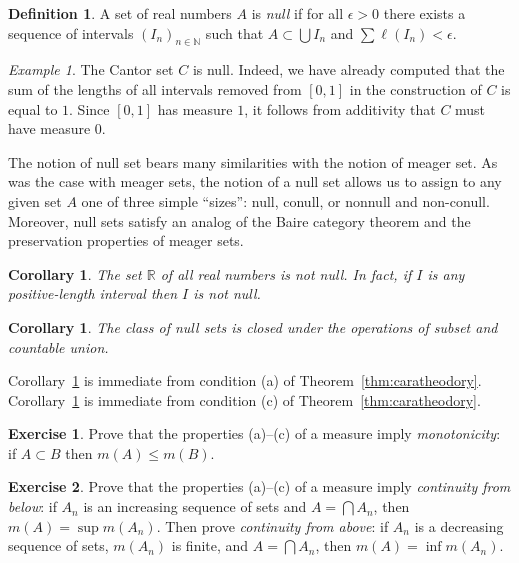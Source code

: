 \documentclass[11pt,oneside,a4paper]{amsbook}
\newcommand{\N}{\mathbb N}
\newcommand{\R}{\mathbb R}
\theoremstyle{definition}
\newtheorem{exercise}{Exercise}[section]
\theoremstyle{plain}
\newtheorem{corollary}[theorem]{Corollary}
\theoremstyle{definition}
\newtheorem{definition}[theorem]{Definition}
\theoremstyle{remark}
\newtheorem{example}[theorem]{Example}
\numberwithin{equation}{section}
\numberwithin{figure}{section}
\begin{document}
\begin{definition}
  \label{defn:null}
  A set of real numbers $A$ is \emph{null} if for all $\epsilon>0$ there exists a sequence of intervals $(I_n)_{n\in\N}$ such that $A\subset\bigcup I_n$ and $\sum\ell(I_n)<\epsilon$.
\end{definition}

\begin{example}
  The Cantor set $C$ is null. Indeed, we have already computed that the sum of the lengths of all intervals removed from $[0,1]$ in the construction of $C$ is equal to $1$. Since $[0,1]$ has measure $1$, it follows from additivity that $C$ must have measure $0$.
\end{example}

The notion of null set bears many similarities with the notion of meager set. As was the case with meager sets, the notion of a null set allows us to assign to any given set $A$ one of three simple ``sizes'': null, conull, or nonnull and non-conull. Moreover, null sets satisfy an analog of the Baire category theorem and the preservation properties of meager sets.

\begin{corollary}
  \label{cor:interval-nonnull}
  The set $\R$ of all real numbers is not null. In fact, if $I$ is any positive-length interval then $I$ is not null.
\end{corollary}

\begin{corollary}
  \label{cor:null-pres}
  The class of null sets is closed under the operations of subset and countable union.
\end{corollary}

Corollary~\ref{cor:interval-nonnull} is immediate from condition (a) of Theorem~\ref{thm:caratheodory}. Corollary~\ref{cor:null-pres} is immediate from condition (c) of Theorem~\ref{thm:caratheodory}.

\begin{exercise}
  Prove that the properties (a)--(c) of a measure imply \emph{monotonicity}: if $A\subset B$ then $m(A)\leq m(B)$.
\end{exercise}

\begin{exercise}
  \label{exerc:continuity-above}
  Prove that the properties (a)--(c) of a measure imply \emph{continuity from below}: if $A_n$ is an increasing sequence of sets and $A=\bigcap A_n$, then $m(A)=\sup m(A_n)$. Then prove \emph{continuity from above}: if $A_n$ is a decreasing sequence of sets, $m(A_n)$ is finite, and $A=\bigcap A_n$, then $m(A)=\inf m(A_n)$.
\end{exercise}
\end{document}
